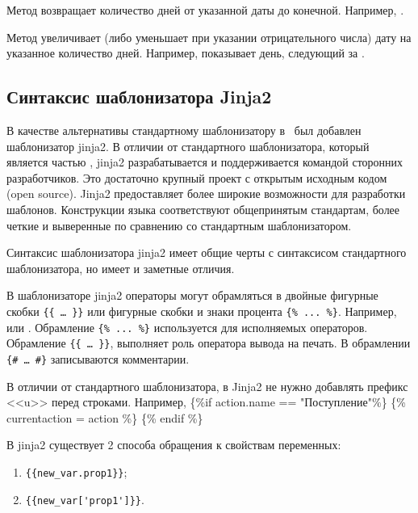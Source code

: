 Метод  возвращает количество дней от указанной даты до конечной. Например, .

Метод  увеличивает (либо уменьшает при указании отрицательного числа) дату на указанное количество дней. Например,  показывает день, следующий за .

\subsection{Синтаксис шаблонизатора Jinja2}

В качестве альтернативы стандартному шаблонизатору в \tmis~был добавлен шаблонизатор jinja2. В отличии от стандартного шаблонизатора, который является частью \tmis, jinja2 разрабатывается и поддерживается командой сторонних разработчиков. Это достаточно крупный проект с открытым исходным кодом (open source). Jinja2 предоставляет более широкие возможности для разработки шаблонов. Конструкции языка соответствуют общепринятым стандартам, более четкие и выверенные по сравнению со стандартным шаблонизатором.

Синтаксис шаблонизатора jinja2 имеет общие черты с синтаксисом стандартного шаблонизатора, но имеет и заметные отличия.

В шаблонизаторе jinja2 операторы могут обрамляться в двойные фигурные скобки \verb|{{ … }}| или фигурные скобки и знаки процента \verb|{% ... %}|. Например,  или . Обрамление \verb|{% ... %}| используется для исполняемых операторов. Обрамление \verb|{{ … }}|, выполняет роль оператора вывода на печать. В обрамлении \verb|{# … #}| записываются комментарии.

\begin{vnim}
 В отличии от стандартного шаблонизатора, в Jinja2 не нужно добавлять префикс <<u>> перед строками. Например,  \{\%if action.name == "Поступление"\%\} \{\% currentaction = action \%\} \{\% endif \%\}
\end{vnim}
 
В jinja2 существует 2 способа обращения к свойствам переменных:
\begin{enumerate}
 \item \verb|{{new_var.prop1}}|;
 \item \verb|{{new_var['prop1']}}|.
\end{enumerate}

